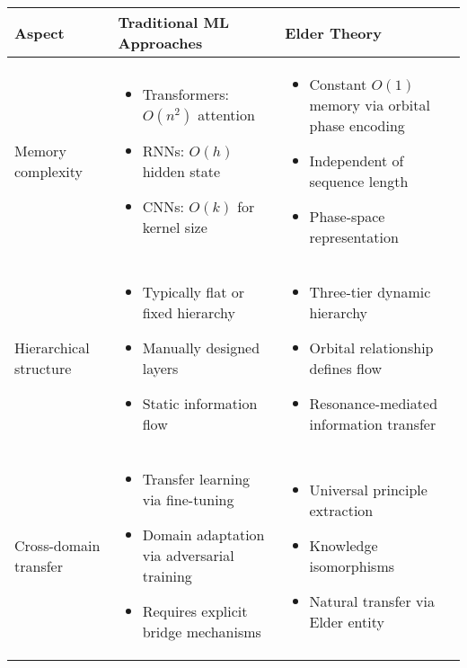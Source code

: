 \begin{center}
\begin{tabular}{|p{3cm}|p{5cm}|p{5cm}|}
\hline
\textbf{Aspect} & \textbf{Traditional ML Approaches} & \textbf{Elder Theory} \\
\hline
Memory complexity & 
\begin{itemize}
    \item Transformers: $O(n^2)$ attention
    \item RNNs: $O(h)$ hidden state
    \item CNNs: $O(k)$ for kernel size
\end{itemize} &
\begin{itemize}
    \item Constant $O(1)$ memory via orbital phase encoding
    \item Independent of sequence length
    \item Phase-space representation
\end{itemize} \\
\hline
Hierarchical structure & 
\begin{itemize}
    \item Typically flat or fixed hierarchy
    \item Manually designed layers
    \item Static information flow
\end{itemize} &
\begin{itemize}
    \item Three-tier dynamic hierarchy
    \item Orbital relationship defines flow
    \item Resonance-mediated information transfer
\end{itemize} \\
\hline
Cross-domain transfer & 
\begin{itemize}
    \item Transfer learning via fine-tuning
    \item Domain adaptation via adversarial training
    \item Requires explicit bridge mechanisms
\end{itemize} &
\begin{itemize}
    \item Universal principle extraction
    \item Knowledge isomorphisms
    \item Natural transfer via Elder entity
\end{itemize} \\

\end{tabular}
\end{center}
